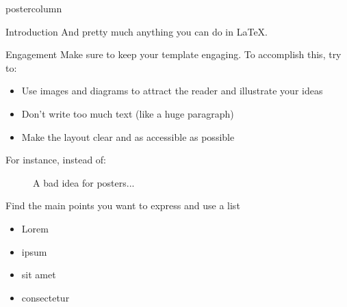 \documentclass{beamer}
\begin{document}
\begin{frame}
\begin{columns}
\begin{column}{.43\textwidth}
\begin{beamercolorbox}[center]{postercolumn}
\begin{minipage}{.98\textwidth}
{\begin{myblock}{Introduction}
				        And pretty much anything you can do in \LaTeX{}.
				        
				        
				    \end{myblock}\vfill
					\begin{myblock}{Engagement}
                        Make sure to keep your template engaging. To accomplish this, try to:
                        \begin{itemize}
                            \item Use images and diagrams to attract the reader and illustrate your ideas
                            \item Don't write too much text (like a huge paragraph)
                            \item Make the layout clear and as accessible as possible
                        \end{itemize}
                        
                        For instance, instead of:
                        
                        \begin{figure}
                            \centering
                            \caption{A bad idea for posters...}
                            \label{fig:my_label}
                        \end{figure}
                        
                        Find the main points you want to express and use a list
                        \begin{itemize}
                            \item Lorem
                            \item ipsum
                            \item sit amet
                            \item consectetur
                        \end{itemize}
                        

\end{myblock}}
\end{minipage}
\end{beamercolorbox}
\end{column}
\end{columns}
\end{frame}
\end{document}
